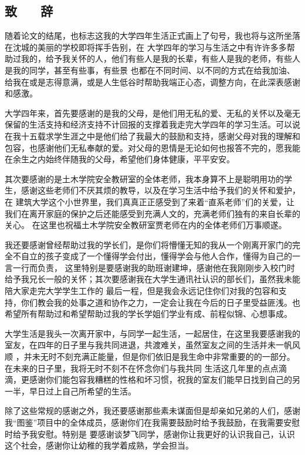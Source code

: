 \begin{center}
    \section*{  \textbf{致 ~~ 辞}}
    \end{center}

随着论文的结尾，也标志这我的大学四年生活正式画上了句号，我也将与这所坐落在沈城的美丽的学校即将挥手告别，在
大学四年的学习与生活之中有许许多多帮助过我的，给予我关怀的人，他们有些人是我的长辈，有些人是我的老师，有些人是我的同学，甚至有些事，有些景
也都在不同时间、以不同的方式在给我加油、给我在或是志得意满，或是人生低谷时帮助我端正心态，调整方向，在此深表感谢和感激。

大学四年来，首先要感谢的是我的父母，是他们用无私的爱、无私的关怀以及毫无保留的生活支持和经济支持不计回报的支撑着我走完大学四年的学习生活。可以说
在我十五载求学生涯之中是他们给了我最大的鼓励和支持，感谢父母对我的理解和包容，也感谢他们无私奉献的爱。对父母的恩情是无论如何也报答不完的，愿我能
在余生之内始终伴随我的父母，希望他们身体健康，平平安安。

其次要感谢的是土木学院安全教研室的全体老师，我本身算不上是聪明用功的学生，感谢这些老师们不厌其烦的教导，以及在学习生活中给予我们的关怀和爱护，在
建筑大学这个小世界里，我们真真正正感受到了来着“直系老师”们的关爱，让我们在离开家庭的保护之后还能感受到充满人文的，充满老师们独有的来自长辈的关心。
在这里也祝福土木学院安全教研室贾老师在内的全体老师们万事顺遂。

我还要感谢曾经帮助过我的学长们，是你们将懵懂无知的我从一个刚离开家门的完全不自立的孩子变成了一个懂得学会付出，懂得学会与他人合作，懂得为自己的一言一行而负责，
这里特别是要感谢我的助班谢建坤，感谢他在我刚刚步入校门时给予我兄长一般的关怀；其次要感谢我在大学生通讯社认识的部长们，虽然我未能陪大家走完大学学生工作的
最后一程，但是我会永远记住你们对我的包容和支持，你们教会我的处事之道和协作之力，一定会让我在今后的日子里受益匪浅。也希望所有帮助过和希望帮助过我的学长学姐们学业有成、前程似锦、心想事成。

大学生活是我头一次离开家中，与同学一起生活，一起居住，在这里我要感谢我的室友，在四年的日子里与我共同进退，共渡难关，虽然室友之间的生活并未一帆风顺
，并未无时不刻充满正能量，但是你们依旧是我生命中非常重要的的一部分。在未来的日子里，我将无时不刻不在怀念你们与我共同
生活这几年里的点点滴滴，更感谢你们能包容我糟糕的性格和坏习惯，祝我的室友们能早日找到自己的另一半，早日过上自己所希望的生活。

除了这些常规的感谢之外，我还要感谢那些素未谋面但是却亲如兄弟的人们，感谢我“图鉴”项目中的全体成员，感谢你们在我需要鼓励时给予我鼓励，在我需要安慰时给予我安慰。特别是
要感谢谈梦飞同学，感谢你让我更好的认识我自己，认识这个社会，感谢你让幼稚的我学着成熟，学会担当。

